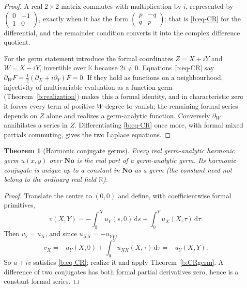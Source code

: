 \documentclass[11pt,a4paper]{article}
\numberwithin{equation}{section}
\newtheorem{theorem}{Theorem}[section]
\theoremstyle{definition}
\theoremstyle{remark}
\theoremstyle{plain}
\newcommand{\K}{\mathbb K}
\newcommand{\No}{\mathbf{No}}
\newcommand{\RR}{\mathbb R}
\newcommand{\dd}{\mathrm d}
\begin{document}
\begin{proof}
A real $2\times2$ matrix commutes with multiplication by $i$, represented
by $\left(\begin{smallmatrix}0&-1\\1&0\end{smallmatrix}\right)$, exactly
when it has the form
$\left(\begin{smallmatrix}p&-q\\q&p\end{smallmatrix}\right)$; that is
\eqref{b:eq-CR} for the differential, and the remainder condition converts
it into the complex difference quotient.

For the germ statement introduce the formal coordinates $Z=X+iY$ and
$W=X-iY$, invertible over $\K$ because $2i\ne0$. Equations
\eqref{b:eq-CR} say $\partial_WF=\tfrac12(\partial_X+i\partial_Y)F=0$. If
they hold as functions on a neighbourhood, injectivity of multivariable
evaluation as a function germ (Theorem~\ref{b:realization}) makes this a formal identity, and
in characteristic zero it forces every term of positive $W$-degree to
vanish; the remaining formal series depends on $Z$ alone and realizes a
germ-analytic function. Conversely $\partial_W$ annihilates a series in
$Z$. Differentiating \eqref{b:eq-CR} once more, with formal mixed partials
commuting, gives the two Laplace equations.
\end{proof}

\begin{theorem}[Harmonic conjugate germs]
\label{b:harmonicgerm}
Every real germ-analytic harmonic germ $u(x,y)$ over $\No$ is the real part
of a germ-analytic germ. Its harmonic conjugate is unique up to a constant in $\No$ as a germ
(the constant need not belong to the ordinary real field $\RR$).
\end{theorem}

\begin{proof}
Translate the centre to $(0,0)$ and define, with coefficientwise formal
primitives,
\[
 v(X,Y)=-\int_0^{X}u_Y(s,0)\,\dd s+\int_0^{Y}u_X(X,\tau)\,\dd\tau .
\]
Then $v_Y=u_X$, and since $u_{XX}=-u_{YY}$,
\[
 v_X=-u_Y(X,0)+\int_0^{Y}u_{XX}(X,\tau)\,\dd\tau=-u_Y(X,Y).
\]
So $u+iv$ satisfies \eqref{b:eq-CR}; realize it and apply
Theorem~\ref{b:CRgerm}. A difference of two conjugates has both formal
partial derivatives zero, hence is a constant formal series.
\end{proof}
\end{document}
